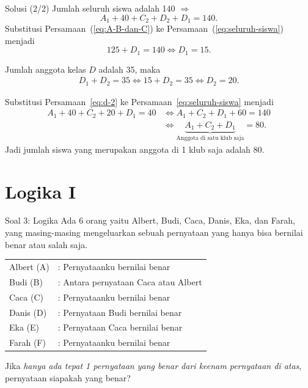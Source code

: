 \documentclass[english,t]{beamer}
\begin{document}
\begin{frame}{Solusi (2/2)}
Jumlah seluruh siswa adalah 140 $\Rightarrow$
\begin{equation}
	A_1 + 40 + C_2 + D_2 + D_1 = 140.
	\label{eq:seluruh-siswa}
\end{equation}
Substitusi Persamaan~(\ref{eq:A-B-dan-C}) ke Persamaan~(\ref{eq:seluruh-siswa}) menjadi
\begin{equation}
	125 + D_1 = 140 \Longleftrightarrow D_1 = 15.
	\label{eq:d-1}
\end{equation}

Jumlah anggota kelas $D$ adalah 35, maka 
\begin{align}
	D_1 + D_2 = 35 \Longleftrightarrow 15 + D_2 = 35 \Longleftrightarrow D_2 = 20.
	\label{eq:d-2}
\end{align}

Substitusi Persamaan~\eqref{eq:d-2} ke Persamaan~\eqref{eq:seluruh-siswa} menjadi
\begin{align*}
	A_1 + 40 + C_2 + 20 + D_1 = 40 &\Leftrightarrow A_1 + C_2 + D_1 + 60 = 140 \\
	                               &\Leftrightarrow \underbrace{A_1 + C_2 + D_1}_{\text{Anggota di satu klub saja}} = 80. 
\end{align*}
Jadi jumlah siswa yang merupakan anggota di 1 klub saja adalah 80.
\end{frame}

\section{Logika I}
\begin{frame}{Soal 3: Logika}
Ada 6 orang yaitu Albert, Budi, Caca, Danis, Eka, dan Farah, yang masing-masing mengeluarkan sebuah pernyataan yang hanya bisa bernilai benar atau salah saja.

\bigskip
\begin{tabular}{ll}
Albert (A) &: Pernyataanku bernilai benar \\
Budi (B)   &: Antara pernyataan Caca atau Albert \\
Caca (C)   &: Pernyataanku bernilai benar \\
Danis (D)  &: Pernyataan Budi bernilai benar \\
Eka (E)    &: Pernyataan Caca bernilai benar \\
Farah (F)  &: Pernyataanku bernilai benar
\end{tabular} 

\bigskip
Jika \textit{hanya ada tepat 1 pernyataan yang benar dari keenam pernyataan di atas}, pernyataan siapakah yang benar?
\end{frame}
\end{document}
